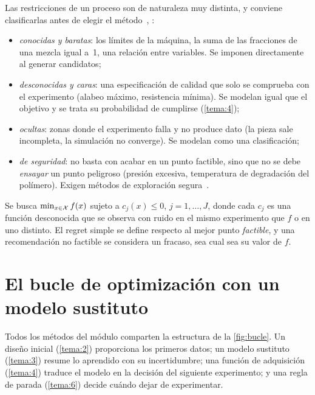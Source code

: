 Las restricciones de un proceso son de naturaleza muy distinta, y conviene clasificarlas antes de elegir el método~\cite[§11.2]{garnett}, \cite[§1.4]{kw}:
\begin{itemize}
  \item \emph{conocidas y baratas}: los límites de la máquina, la suma de las fracciones de una mezcla igual a~1, una relación entre variables. Se imponen directamente al generar candidatos;
  \item \emph{desconocidas y caras}: una especificación de calidad que solo se comprueba con el experimento (alabeo máximo, resistencia mínima). Se modelan igual que el objetivo y se trata su probabilidad de cumplirse (\cref{tema:4});
  \item \emph{ocultas}: zonas donde el experimento falla y no produce dato (la pieza sale incompleta, la simulación no converge). Se modelan como una clasificación;
  \item \emph{de seguridad}: no basta con acabar en un punto factible, sino que no se debe \emph{ensayar} un punto peligroso (presión excesiva, temperatura de degradación del polímero). Exigen métodos de exploración segura~\cite[§16.6]{kw}.
\end{itemize}

\begin{definicion}\label{def:restricciones}
Se busca $\min_{x\in\mathcal{X}}f(x)$ sujeto a $c_j(x)\le 0$, $j=1,\dots,J$, donde cada $c_j$ es una función desconocida que se observa con ruido en el mismo experimento que $f$ o en uno distinto. El regret simple se define respecto al mejor punto \emph{factible}, y una recomendación no factible se considera un fracaso, sea cual sea su valor de $f$.
\end{definicion}

\section{El bucle de optimización con un modelo sustituto}

Todos los métodos del módulo comparten la estructura de la \cref{fig:bucle}. Un diseño inicial (\cref{tema:2}) proporciona los primeros datos; un modelo sustituto (\cref{tema:3}) resume lo aprendido con su incertidumbre; una función de adquisición (\cref{tema:4}) traduce el modelo en la decisión del siguiente experimento; y una regla de parada (\cref{tema:6}) decide cuándo dejar de experimentar.

